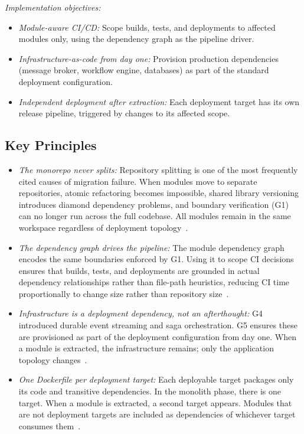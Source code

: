 \emph{Implementation objectives:}
\begin{itemize}[itemsep=8pt,topsep=2pt]
  \item \emph{Module-aware CI/CD:} Scope builds, tests, and deployments to affected modules only, using the dependency graph as the pipeline driver.
  \item \emph{Infrastructure-as-code from day one:} Provision production dependencies (message broker, workflow engine, databases) as part of the standard deployment configuration.
  \item \emph{Independent deployment after extraction:} Each deployment target has its own release pipeline, triggered by changes to its affected scope.
\end{itemize}

\subsection*{Key Principles}

\begin{itemize}[itemsep=8pt,topsep=2pt]
  \item \emph{The monorepo never splits:} Repository splitting is one of the most frequently cited causes of migration failure. When modules move to separate repositories, atomic refactoring becomes impossible, shared library versioning introduces diamond dependency problems, and boundary verification (G1) can no longer run across the full codebase. All modules remain in the same workspace regardless of deployment topology~\cite{gravanis2021dont}.

  \item \emph{The dependency graph drives the pipeline:} The module dependency graph encodes the same boundaries enforced by G1. Using it to scope CI decisions ensures that builds, tests, and deployments are grounded in actual dependency relationships rather than file-path heuristics, reducing CI time proportionally to change size rather than repository size~\cite{FordParsons2017}.

  \item \emph{Infrastructure is a deployment dependency, not an afterthought:} G4 introduced durable event streaming and saga orchestration. G5 ensures these are provisioned as part of the deployment configuration from day one. When a module is extracted, the infrastructure remains; only the application topology changes~\cite{ghemawat2023towards}.

  \item \emph{One Dockerfile per deployment target:} Each deployable target packages only its code and transitive dependencies. In the monolith phase, there is one target. When a module is extracted, a second target appears. Modules that are not deployment targets are included as dependencies of whichever target consumes them~\cite{richardson2018microservices,newman2019monolith}.
\end{itemize}


